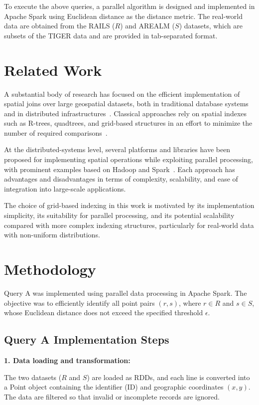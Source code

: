 \documentclass[sigconf,nonacm]{acmart}
\begin{document}
To execute the above queries, a parallel algorithm is designed and implemented in Apache Spark using Euclidean distance as the distance metric. The real-world data are obtained from the RAILS ($R$) and AREALM ($S$) datasets, which are subsets of the TIGER data and are provided in tab-separated format.


\section{Related Work}
A substantial body of research has focused on the efficient implementation of spatial joins over large geospatial datasets, both in traditional database systems and in distributed infrastructures~\cite{vu2024learning,shekhar2014spatial}. Classical approaches rely on spatial indexes such as R-trees, quadtrees, and grid-based structures in an effort to minimize the number of required comparisons~\cite{beckmann1990r}.

At the distributed-systems level, several platforms and libraries have been proposed for implementing spatial operations while exploiting parallel processing, with prominent examples based on Hadoop and Spark~\cite{eldawy2015spatialhadoop,yu2015geospark}. Each approach has advantages and disadvantages in terms of complexity, scalability, and ease of integration into large-scale applications.

The choice of grid-based indexing in this work is motivated by its implementation simplicity, its suitability for parallel processing, and its potential scalability compared with more complex indexing structures, particularly for real-world data with non-uniform distributions.


\section{Methodology}
Query A was implemented using parallel data processing in Apache Spark. The objective was to efficiently identify all point pairs $(r,s)$, where $r \in R$ and $s \in S$, whose Euclidean distance does not exceed the specified threshold $\epsilon$.

\subsection*{Query A Implementation Steps}

\textbf{1. Data loading and transformation:} 

The two datasets ($R$ and $S$) are loaded as RDDs, and each line is converted into a Point object containing the identifier (ID) and geographic coordinates $(x, y)$. The data are filtered so that invalid or incomplete records are ignored.
\end{document}

